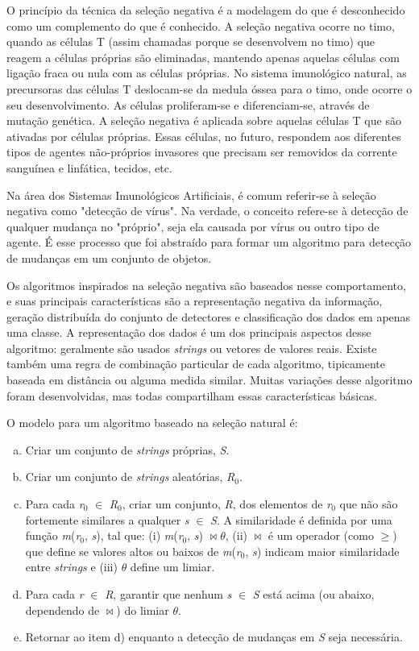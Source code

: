 O princípio da técnica da seleção negativa é a modelagem do que é desconhecido como um complemento do que é conhecido. A seleção negativa ocorre no timo, quando as células T (assim chamadas porque se desenvolvem no timo) que reagem a células próprias são eliminadas, mantendo apenas aquelas células com ligação fraca ou nula com as células próprias. No sistema imunológico natural, as precursoras das células T deslocam-se da medula óssea para o timo, onde ocorre o seu desenvolvimento. As células proliferam-se e diferenciam-se, através de mutação genética. A seleção negativa é aplicada sobre aquelas células T que são ativadas por células próprias. Essas células, no futuro, respondem aos diferentes tipos de agentes não-próprios invasores que precisam ser removidos da corrente sanguínea e linfática, tecidos, etc.

Na área dos Sistemas Imunológicos Artificiais, é comum referir-se à seleção negativa como "detecção de vírus". Na verdade, o conceito refere-se à detecção de qualquer mudança no "próprio", seja ela causada por vírus ou outro tipo de agente. É esse processo que foi abstraído para formar um algoritmo para detecção de mudanças em um conjunto de objetos.

Os algoritmos inspirados na seleção negativa são baseados nesse comportamento, e suas principais características são a representação negativa da informação, geração distribuída do conjunto de detectores e classificação dos dados em apenas uma classe. A representação dos dados é um dos principais aspectos desse algoritmo: geralmente são usados \emph{strings} ou vetores de valores reais. Existe também uma regra de combinação particular de cada algoritmo, tipicamente baseada em distância ou alguma medida similar. Muitas variações desse algoritmo foram desenvolvidas, mas todas compartilham essas características básicas.

O modelo para um algoritmo baseado na seleção natural é:

\begin{enumerate}[a)]
    \item Criar um conjunto de \emph{strings} próprias, \emph{S}.
    \item Criar um conjunto de \emph{strings} aleatórias, \emph{R$_{0}$}.
    \item Para cada \emph{r$_{0}$} $\in$ \emph{R$_{0}$}, criar um conjunto, \emph{R}, dos elementos de \emph{r$_{0}$} que não são fortemente similares a qualquer \emph{s} $\in$ \emph{S}. A similaridade é definida por uma função \emph{m}(\emph{r$_{0}$}, \emph{s}), tal que: (i) \emph{m}(\emph{r$_{0}$}, \emph{s}) $\bowtie \theta$, (ii) $\bowtie$ é um operador (como $\ge$) que define se valores altos ou baixos de \emph{m}(\emph{r$_{0}$}, \emph{s}) indicam maior similaridade entre \emph{strings} e (iii) $\theta$ define um limiar.
    \item Para cada \emph{r} $\in$ \emph{R}, garantir que nenhum \emph{s} $\in$ \emph{S} está acima (ou abaixo, dependendo de $\bowtie$) do limiar $\theta$.
    \item Retornar ao item d) enquanto a detecção de mudanças em \emph{S} seja necessária.
\end{enumerate}

